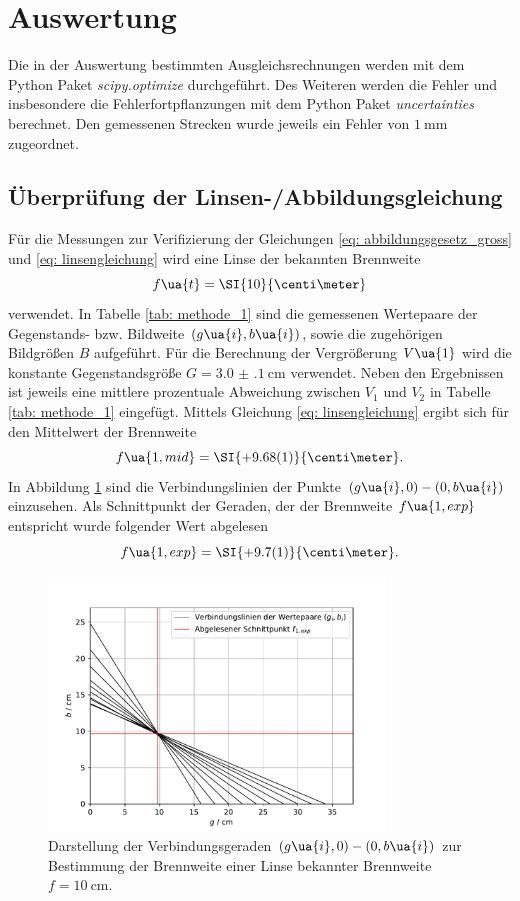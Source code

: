 \section{Auswertung}
Die in der Auswertung bestimmten Ausgleichsrechnungen werden mit
dem Python Paket \emph{scipy.optimize}\cite{scipy} durchgeführt.
Des Weiteren werden die Fehler und insbesondere die Fehlerfortpflanzungen
mit dem Python Paket \emph{uncertainties}\cite{uncertainties} berechnet.
Den gemessenen Strecken wurde jeweils ein Fehler von $\SI{1}{\milli\meter}$ zugeordnet. %
\subsection{Überprüfung der Linsen-/Abbildungsgleichung}
Für die Messungen zur Verifizierung der Gleichungen \eqref{eq: abbildungsgesetz_gross} und \eqref{eq: linsengleichung} wird eine Linse
der bekannten Brennweite
\begin{equation}
  f\ua{t} = \SI{10}{\centi\meter}
\end{equation}
verwendet. In Tabelle \ref{tab: methode_1} sind die gemessenen Wertepaare der Gegenstands- bzw. Bildweite $(g\ua{i}, b\ua{i})$,
sowie die zugehörigen Bildgrößen $B$ aufgeführt. Für die Berechnung der Vergrößerung $V\ua{1}$
wird die konstante Gegenstandsgröße $G = \SI{3.0(1)}{\centi\meter}$ verwendet. Neben den Ergebnissen ist jeweils
eine mittlere prozentuale Abweichung zwischen $V_1$ und $V_2$ in Tabelle \ref{tab: methode_1} eingefügt.
Mittels Gleichung \eqref{eq: linsengleichung} ergibt sich für den Mittelwert der Brennweite
\begin{equation}
  f\ua{1, mid} = \SI{+9.68(1)}{\centi\meter}.
\end{equation}
In Abbildung \ref{fig: methode_1} sind die Verbindungslinien der Punkte $(g\ua{i}, 0)-(0, b\ua{i})$ einzusehen. Als Schnittpunkt
der Geraden, der der Brennweite $f\ua{1, exp}$ entspricht wurde folgender Wert abgelesen
\begin{equation}
  f\ua{1, exp} = \SI{+9.7(1)}{\centi\meter}.
\end{equation}
\begin{figure}
  \centering
  \includegraphics[width=0.8\textwidth]{../Messdaten/plots/methode_1.pdf}
  \caption{Darstellung der Verbindungsgeraden $(g\ua{i}, 0) - (0, b\ua{i})$ zur Bestimmung der Brennweite einer
  Linse bekannter Brennweite $f = \SI{10}{\centi\meter}$.}
  \label{fig: methode_1}
\end{figure}

